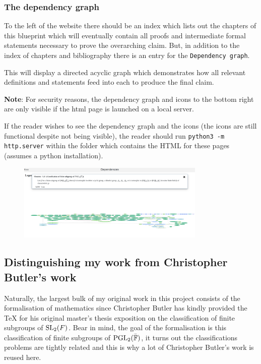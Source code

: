 \subsubsection{The dependency graph}

To the left of the website there should be an index which lists out the chapters of this blueprint which will eventually contain all proofs and intermediate formal statements necessary
to prove the overarching claim. But, in addition to the index of chapters and bibliography there is an entry for the \texttt{Dependency graph}.

This will display a directed acyclic graph which demonstrates how all relevant definitions and statements feed into each to produce the final claim.

\textbf{Note}: For security reasons, the dependency graph and icons to the bottom right are only visible if the html page is launched on a local server.

If the reader wishes to see the dependency graph and the icons (the icons are still functional despite not being visible), the reader should run
\texttt{python3 -m http.server} within the folder which contains the HTML for these pages (assumes a python installation).

\begin{figure}
    \includegraphics[width=0.8\textwidth]{dependencygraph.png}
\end{figure}

\subsection{Distinguishing my work from Christopher Butler's work}


Naturally, the largest bulk of my original work in this project consists of the formalisation of mathematics since Christopher Butler has kindly provided the TeX for his original master's thesis exposition on
the classification of finite subgroups of $\operatorname{SL}_2(F)$. Bear in mind, the goal of the formalisation is this classification of finite subgroups of $\operatorname{PGL}_2(\bar{\mathbb{F}})$, it turns out the classifications problems are tightly
related and this is why a lot of Christopher Butler's work is reused here.

